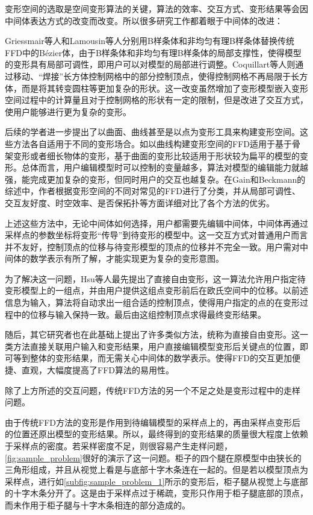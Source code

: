     变形空间的选取是空间变形算法的关键，算法的效率、交互方式、变形结果等会因中间体表达方式的改变而改变。所以很多研究工作都着眼于中间体的改进：

    Griessmair等人\cite{Griessmair89}和Lamousin等人\cite{lamousin1994}分别用B样条体和非均匀有理B样条体替换传统FFD\cite{Sederberg86}中的Bézier体，由于B样条体和非均匀有理B样条体的局部支撑性，使得模型的变形具有局部可调性，即用户可以对模型的局部进行调整。Coquillart等人\cite{coquillart1990}则通过移动、“焊接”长方体控制网格中的部分控制顶点，使得控制网格不再局限于长方体，而是将其转变圆柱等更加复杂的形状。这一改变虽然增加了变形模型嵌入变形空间过程中的计算量且对于控制网格的形状有一定的限制，但是改进了交互方式，使用户能够进行更为复杂的变形。

    后续的学者进一步提出了以曲面\cite{feng1996, decaudin1996}、曲线\cite{lazarus1994axial, chang1994generalized}甚至是以点\cite{moccozet1997dirichlet, borrel1994simple}为变形工具来构建变形空间。这些方法各自适用于不同的变形场合。如以曲线构建变形空间的FFD适用于基于骨架变形或者细长物体的变形，基于曲面的变形比较适用于形状较为扁平的模型的变形。总体而言，用户编辑模型时可以控制的变量越多，算法对模型的编辑能力就越强，能完成更加复杂的变形，但同时用户的交互也越复杂。在Gain和Beckmann的综述\cite{Gain08}中，作者根据变形空间的不同对常见的FFD进行了分类，并从局部可调性、交互友好度、时空效率、是否保拓扑等方面详细对比了各个方法的优劣。

    上述这些方法中，无论中间体如何选择，用户都需要先编辑中间体，中间体再通过采样点的参数坐标将变形“传导”到待变形的模型中。这一交互方式对普通用户而言并不友好，控制顶点的位移与待变形模型的顶点的位移并不完全一致。用户需对中间体的数学表示有所了解，才能实现更为复杂的变形意图。

    为了解决这一问题，Hsu等人\cite{hsu1992}最先提出了直接自由变形，这一算法允许用户指定待变形模型上的一组点，并由用户提供这组点变形前后在欧氏空间中的位移。以前述信息为输入，算法将自动求出一组合适的控制顶点，使得用户指定的点的在变形过程中的位移与输入保持一致。最后由这组控制顶点求得最终变形结果。

    随后，其它研究者也在此基础上提出了许多类似方法，统称为直接自由变形。这一类方法直接关联用户输入和变形结果，用户直接编辑模型变形后关键点的位置，即可等到整体的变形结果，而无需关心中间体的数学表示。使得FFD的交互更加便捷、直观，大幅度提高了FFD算法的易用性。

    除了上方所述的交互问题，传统FFD方法的另一个不足之处是变形过程中的走样问题。

    由于传统FFD方法的变形是作用到待编辑模型的采样点上的，再由采样点变形后的位置还原出模型的变形结果。所以，最终得到的变形结果的质量很大程度上依赖于采样点的密度。若采样密度不足，则很容易产生走样问题，\autoref{fig:sample_problem}很好的演示了这一问题。柜子的四个腿在原模型中由狭长的三角形组成，并且从视觉上看是与底部十字木条连在一起的。但是若以模型顶点为采样点，进行如\autoref{subfig:sample_problem_1}所示的变形后，柜子腿从视觉上与底部的十字木条分开了。这是由于采样点过于稀疏，变形只作用于柜子腿底部的顶点，而未作用于柜子腿与十字木条相连的部分造成的。

